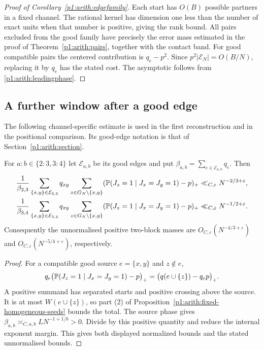\begin{proof}[Proof of Corollary~\ref{p1:arith:edgefamily}]
Each start has $O(B)$ possible partners in a fixed channel.  The rational
kernel has dimension one less than the number of exact units when that
number is positive, giving the rank bound.  All pairs excluded from the good
family have precisely the error mass estimated in the proof of
Theorem~\ref{p1:arith:pairs}, together with the contact band.
For good compatible pairs the centered contribution is $q_e-p^2$.
Since $p^2|\mathcal E_N|=O(B/N)$, replacing it by $q_e$ has the stated cost.
The asymptotic follows from \eqref{p1:arith:leadingphase}.
\end{proof}

\subsection{A further window after a good edge}
\label{p14:comp:pair-palm}

The following channel-specific estimate is used in the first reconstruction
and in the positional comparison. Its good-edge notation is that of
Section~\ref{p1:arith:section}.

\begin{proposition}\label{p1:arith:palm}
For $a:b\in\{2:3,3:4\}$ let $\mathcal E_{a,b}$ be its good edges and put
$\beta_{a,b}=\sum_{e\in\mathcal E_{a,b}}q_e$.  Then
\begin{align}
 \frac1{\beta_{2,3}}\sum_{\{x,y\}\in\mathcal E_{2,3}}q_{xy}
    \sum_{z\in G_N\setminus\{x,y\}}
       (\P(J_z=1\mid J_x=J_y=1)-p)_+
   &\ll_{C,\varepsilon}N^{-2/3+\varepsilon},\label{p1:arith:palm23}\\
 \frac1{\beta_{3,4}}\sum_{\{x,y\}\in\mathcal E_{3,4}}q_{xy}
    \sum_{z\in G_N\setminus\{x,y\}}
       (\P(J_z=1\mid J_x=J_y=1)-p)_+
   &\ll_{C,\varepsilon}N^{-1/2+\varepsilon}.\label{p1:arith:palm34}
\end{align}
Consequently the unnormalised positive two-block masses are
$O_{C,\varepsilon}(N^{-4/3+\varepsilon})$ and
$O_{C,\varepsilon}(N^{-5/4+\varepsilon})$, respectively.
\end{proposition}

\begin{proof}
For a compatible good source $e=\{x,y\}$ and $z\notin e$,
\[
 q_e\bigl(\P(J_z=1\mid J_x=J_y=1)-p\bigr)_+
       =\bigl(q(e\cup\{z\})-q_ep\bigr)_+.
\]
A positive summand has separated starts and positive crossing above
the source. It is at most $W(e\cup\{z\})$, so part (2) of
Proposition~\ref{p1:arith:fixed-homogeneous-seeds} bounds the total.
The source phase gives $\beta_{a,b}\asymp_{C,a,b}LN^{-1+1/b}>0$.
Divide by this positive quantity and reduce the internal exponent
margin. This gives both displayed normalized bounds and the stated
unnormalised bounds.
\end{proof}
